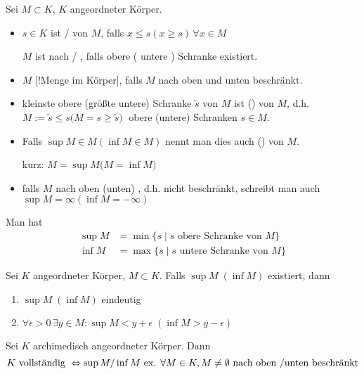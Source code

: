 \begin{definition}
	Sei $M\subset K$, $K$ angeordneter Körper.
	\begin{itemize}
		\item $s\in K$ ist  /   von $M$, falls $x \le s (x \ge s)\,\forall x\in M$
		
		$M$ ist nach  /  , falls obere ( untere ) Schranke existiert.
		\item $M$ [!Menge im Körper], falls $M$ nach oben und unten beschränkt.
		\item kleinste obere (größte untere) Schranke $\tilde{s}$ von $M$ ist  () von $M$, d.h. \\
		$ M:= \tilde{s} \le s ($$ M = s \ge \tilde{s}) \;$ obere (untere) Schranken $s\in M$.
		\item Falls $\sup M \in M (\inf M\in M)$ nennt man dies auch  () von $M$.
		
		kurz: $M = \sup M ($$M = \inf M)$
		\item falls $M$ nach oben (unten) , d.h. nicht beschränkt, schreibt man auch $\sup M = \infty (\inf M = -\infty)$
	\end{itemize}

	Man hat
	\begin{align*}
	\sup M &= \min\{s \mid s \text{ obere Schranke von } M\}\\
	\inf M &= \max\{s \mid s \text{ untere Schranke von } M\}
	\end{align*}
\end{definition}
\begin{proposition}
	Sei $K$ angeordneter Körper, $M\subset K$. Falls $\sup M\;(\inf M)$ existiert, dann
	\begin{enumerate}[label={\arabic*)}]
		\item $\sup M\;(\inf M)$ eindeutig
		\item $\forall \epsilon > 0\,\exists y\in M: \sup M < y + \epsilon\;(\inf M > y - \epsilon)$
	\end{enumerate}
\end{proposition}

\begin{theorem}
	Sei $K$ archimedisch angeordneter Körper. Dann
	\[ K \text{ vollständig } \Leftrightarrow \sup M \slash \inf M \text{ ex. }\forall M\in K, M\neq \emptyset \text{ nach oben \slash unten beschränkt} \]
\end{theorem}

